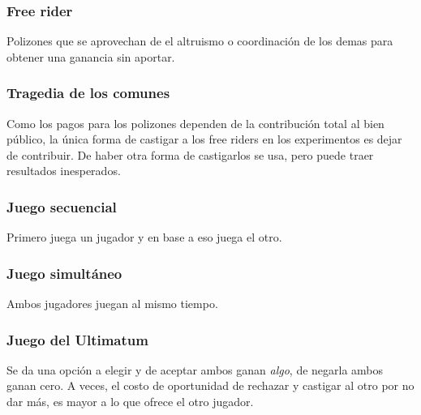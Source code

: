 \subsubsection{Free rider} Polizones que se aprovechan de el altruismo o coordinación de los demas para obtener una ganancia sin aportar.


\subsubsection{Tragedia de los comunes} Como los pagos para los polizones dependen de la contribución total al bien público, la única forma de castigar a los free riders en los experimentos es dejar de contribuir. De haber otra forma de castigarlos se usa, pero puede traer resultados inesperados.


\subsubsection{Juego secuencial} Primero juega un jugador y en base a eso juega el otro.


\subsubsection{Juego simultáneo} Ambos jugadores juegan al mismo tiempo.


\subsubsection{Juego del Ultimatum} Se da una opción a elegir y de aceptar ambos ganan \textit{algo}, de negarla ambos ganan cero. A veces, el costo de oportunidad de rechazar y castigar al otro por no dar más, es mayor a lo que ofrece el otro jugador.


\newpage